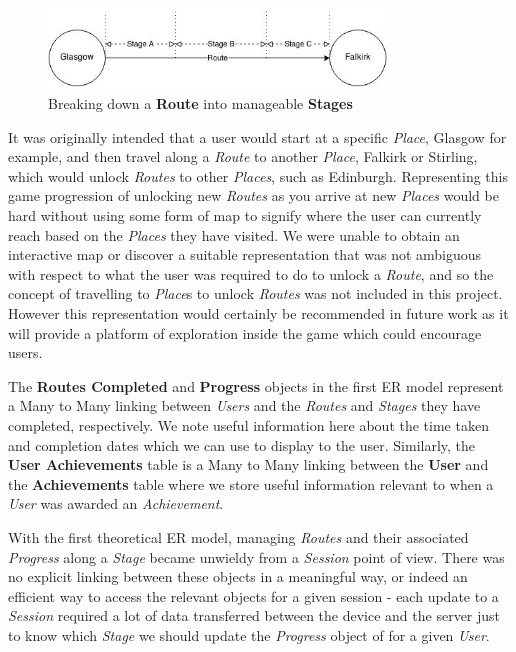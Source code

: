 \begin{figure}[h]
  \centering
  \includegraphics[width=0.8\textwidth]{images/route_breakdown.jpg}
  \caption{Breaking down a \textbf{Route} into manageable
    \textbf{Stages}}
  \label{fig:route_breakdown}
\end{figure}

It was originally intended that a user would start at a
specific \emph{Place}, Glasgow for example, and then travel along a
\emph{Route} to another \emph{Place}, Falkirk or Stirling, which
would unlock \emph{Routes} to other \emph{Places}, such as
Edinburgh. Representing this game progression of unlocking new
\emph{Routes} as you arrive at new \emph{Places} would be hard
without 
using some form of map to signify where the user can currently reach
based on the \emph{Places} they have visited. We were unable to obtain an
interactive map or discover a suitable representation that was not
ambiguous with respect to what the user was required to do to unlock a
\emph{Route}, and so the concept of travelling to \emph{Place}s to
unlock \emph{Routes} was not included in this project. However this
representation would certainly be recommended in future work as it
will provide a platform of exploration inside the game which could
encourage users. 

The \textbf{Routes Completed} and \textbf{Progress} objects in the
first ER model represent a Many to Many linking between \emph{Users}
and the \emph{Routes} and \emph{Stages} they have completed,
respectively. We note useful information here about the time taken and
completion dates which we can use to display to the user. Similarly,
the \textbf{User Achievements} table is a Many to Many linking
between the \textbf{User} and the \textbf{Achievements} table where we
store useful information relevant to when a \emph{User} was awarded an
\emph{Achievement}.

With the first theoretical ER model, managing \emph{Routes} and their 
associated \emph{Progress} along a \emph{Stage} became unwieldy from
a \emph{Session} point of view. There was no explicit linking between
these objects in a meaningful way, or indeed an efficient way to
access the relevant objects for a given session - each update to a
\emph{Session} required a lot of data transferred between the device
and the server just to know which \emph{Stage} we should update the
\emph{Progress} object of for a given \emph{User}.

